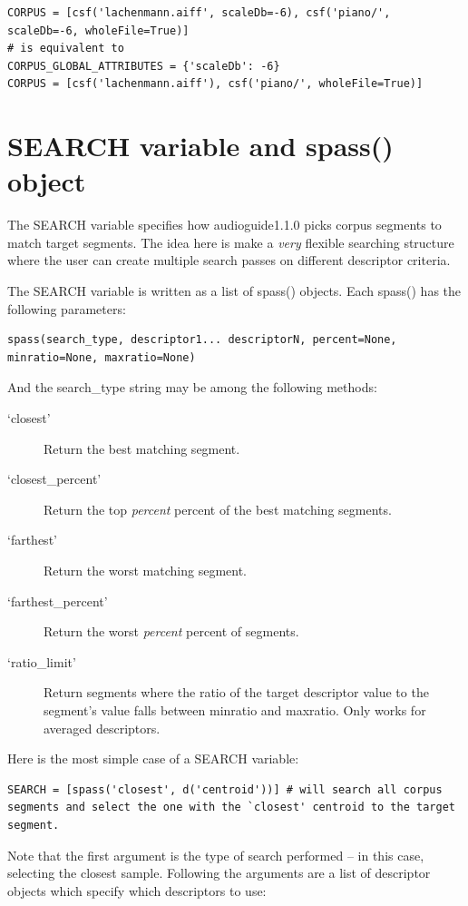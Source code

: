 \documentclass{article}
\newcommand{\ag}{audioguide1.1.0\xspace}
\begin{document}
\begin{spacing}{1.2}
\begin{lstlisting}
CORPUS = [csf('lachenmann.aiff', scaleDb=-6), csf('piano/', scaleDb=-6, wholeFile=True)]
# is equivalent to 
CORPUS_GLOBAL_ATTRIBUTES = {'scaleDb': -6}
CORPUS = [csf('lachenmann.aiff'), csf('piano/', wholeFile=True)]
\end{lstlisting}


\section{SEARCH variable and spass() object}
The SEARCH variable specifies how \ag picks corpus segments to match target segments.  The idea here is make a \emph{very} flexible searching structure where the user can create multiple search passes on different descriptor criteria.

The SEARCH variable is written as a list of spass() objects.  Each spass() has the following parameters: 
\begin{lstlisting}
spass(search_type, descriptor1... descriptorN, percent=None, minratio=None, maxratio=None)
\end{lstlisting}

And the search\_type string may be among the following methods:
\begin{description}
\item[`closest'] Return the best matching segment.
\item[`closest\_percent'] Return the top \emph{percent} percent of the best matching segments.
\item[`farthest'] Return the worst matching segment.
\item[`farthest\_percent'] Return the worst \emph{percent} percent of segments.
\item[`ratio\_limit'] Return segments where the ratio of the target descriptor value to the segment's value falls between minratio and maxratio.  Only works for averaged descriptors.
\end{description}


Here is the most simple case of a SEARCH variable:
\begin{lstlisting}
SEARCH = [spass('closest', d('centroid'))] # will search all corpus segments and select the one with the `closest' centroid to the target segment.
\end{lstlisting}

Note that the first argument is the type of search performed -- in this case, selecting the closest sample.  Following the arguments are a list of descriptor objects which specify which descriptors to use:


\end{spacing}
\end{document}
